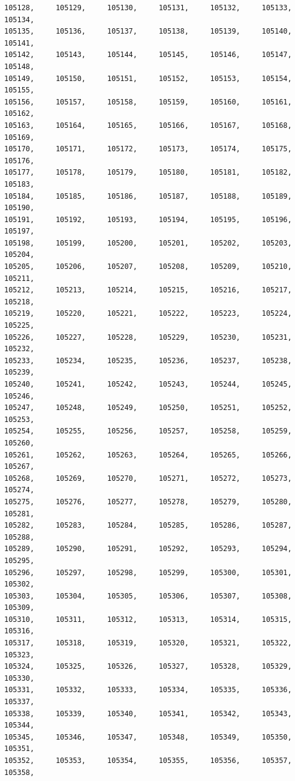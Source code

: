 \documentclass[a4paper,11pt]{report}
\begin{document}
\begin{verbatim}
105128,     105129,     105130,     105131,     105132,     105133,     105134,
105135,     105136,     105137,     105138,     105139,     105140,     105141,
105142,     105143,     105144,     105145,     105146,     105147,     105148,
105149,     105150,     105151,     105152,     105153,     105154,     105155,
105156,     105157,     105158,     105159,     105160,     105161,     105162,
105163,     105164,     105165,     105166,     105167,     105168,     105169,
105170,     105171,     105172,     105173,     105174,     105175,     105176,
105177,     105178,     105179,     105180,     105181,     105182,     105183,
105184,     105185,     105186,     105187,     105188,     105189,     105190,
105191,     105192,     105193,     105194,     105195,     105196,     105197,
105198,     105199,     105200,     105201,     105202,     105203,     105204,
105205,     105206,     105207,     105208,     105209,     105210,     105211,
105212,     105213,     105214,     105215,     105216,     105217,     105218,
105219,     105220,     105221,     105222,     105223,     105224,     105225,
105226,     105227,     105228,     105229,     105230,     105231,     105232,
105233,     105234,     105235,     105236,     105237,     105238,     105239,
105240,     105241,     105242,     105243,     105244,     105245,     105246,
105247,     105248,     105249,     105250,     105251,     105252,     105253,
105254,     105255,     105256,     105257,     105258,     105259,     105260,
105261,     105262,     105263,     105264,     105265,     105266,     105267,
105268,     105269,     105270,     105271,     105272,     105273,     105274,
105275,     105276,     105277,     105278,     105279,     105280,     105281,
105282,     105283,     105284,     105285,     105286,     105287,     105288,
105289,     105290,     105291,     105292,     105293,     105294,     105295,
105296,     105297,     105298,     105299,     105300,     105301,     105302,
105303,     105304,     105305,     105306,     105307,     105308,     105309,
105310,     105311,     105312,     105313,     105314,     105315,     105316,
105317,     105318,     105319,     105320,     105321,     105322,     105323,
105324,     105325,     105326,     105327,     105328,     105329,     105330,
105331,     105332,     105333,     105334,     105335,     105336,     105337,
105338,     105339,     105340,     105341,     105342,     105343,     105344,
105345,     105346,     105347,     105348,     105349,     105350,     105351,
105352,     105353,     105354,     105355,     105356,     105357,     105358,

\end{verbatim}
\end{document}

